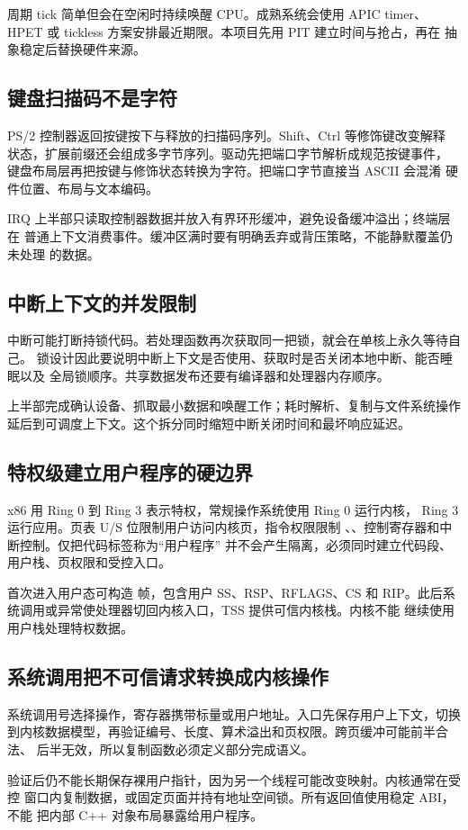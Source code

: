 周期 tick 简单但会在空闲时持续唤醒 CPU。成熟系统会使用 APIC timer、
HPET 或 tickless 方案安排最近期限。本项目先用 PIT 建立时间与抢占，再在
抽象稳定后替换硬件来源。

\subsection{键盘扫描码不是字符}

PS/2 控制器返回按键按下与释放的扫描码序列。Shift、Ctrl 等修饰键改变解释
状态，扩展前缀还会组成多字节序列。驱动先把端口字节解析成规范按键事件，
键盘布局层再把按键与修饰状态转换为字符。把端口字节直接当 ASCII 会混淆
硬件位置、布局与文本编码。

IRQ 上半部只读取控制器数据并放入有界环形缓冲，避免设备缓冲溢出；终端层在
普通上下文消费事件。缓冲区满时要有明确丢弃或背压策略，不能静默覆盖仍未处理
的数据。

\subsection{中断上下文的并发限制}

中断可能打断持锁代码。若处理函数再次获取同一把锁，就会在单核上永久等待自己。
锁设计因此要说明中断上下文是否使用、获取时是否关闭本地中断、能否睡眠以及
全局锁顺序。共享数据发布还要有编译器和处理器内存顺序。

上半部完成确认设备、抓取最小数据和唤醒工作；耗时解析、复制与文件系统操作
延后到可调度上下文。这个拆分同时缩短中断关闭时间和最坏响应延迟。

\subsection{特权级建立用户程序的硬边界}

x86 用 Ring 0 到 Ring 3 表示特权，常规操作系统使用 Ring 0 运行内核，
Ring 3 运行应用。页表 U/S 位限制用户访问内核页，指令权限限制
、、控制寄存器和中断控制。仅把代码标签称为“用户程序”
并不会产生隔离，必须同时建立代码段、用户栈、页权限和受控入口。

首次进入用户态可构造  帧，包含用户 SS、RSP、RFLAGS、CS 和
RIP。此后系统调用或异常使处理器切回内核入口，TSS 提供可信内核栈。内核不能
继续使用用户栈处理特权数据。

\subsection{系统调用把不可信请求转换成内核操作}

系统调用号选择操作，寄存器携带标量或用户地址。入口先保存用户上下文，切换
到内核数据模型，再验证编号、长度、算术溢出和页权限。跨页缓冲可能前半合法、
后半无效，所以复制函数必须定义部分完成语义。

验证后仍不能长期保存裸用户指针，因为另一个线程可能改变映射。内核通常在受控
窗口内复制数据，或固定页面并持有地址空间锁。所有返回值使用稳定 ABI，不能
把内部 C++ 对象布局暴露给用户程序。
